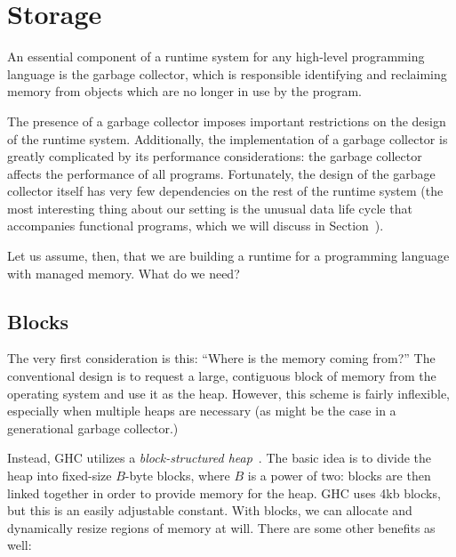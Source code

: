 \section{Storage}

An essential component of a runtime system for any high-level
programming language is the garbage collector, which is responsible
identifying and reclaiming memory from objects which are no longer in
use by the program.

The presence of a garbage collector imposes important restrictions on
the design of the runtime system.  Additionally, the implementation of a
garbage collector is greatly complicated by its performance
considerations: the garbage collector affects the performance of all
programs.  Fortunately, the design of the garbage collector itself has
very few dependencies on the rest of the runtime system (the most
interesting thing about our setting is the unusual data life cycle that
accompanies functional programs, which we will discuss in Section~\XXX).

Let us assume, then, that we are building a runtime for a programming
language with managed memory.  What do we need?

\subsection{Blocks}

The very first consideration is this: ``Where is the memory coming
from?''  The conventional design is to request a large, contiguous block
of memory from the operating system and use it as the heap.  However,
this scheme is fairly inflexible, especially when multiple heaps are
necessary (as might be the case in a generational garbage collector.)

Instead, GHC utilizes a \emph{block-structured heap}~\cite{Marlow:2008:PGG:1375634.1375637}.
The basic idea is to divide the heap into fixed-size $B$-byte blocks,
where $B$ is a power of two: blocks are then linked together in order to
provide memory for the heap.  GHC uses 4kb blocks, but this is an easily
adjustable constant.  With blocks, we can allocate and dynamically
resize regions of memory at will.  There are some other benefits as well:

